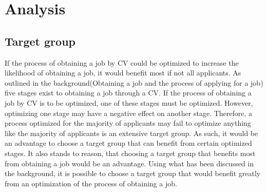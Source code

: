 \section{Analysis}\label{sec:analysis}

\subsection{Target group}
If the process of obtaining a job by CV could be optimized to increase the likelihood of obtaining a job, it would benefit most if not all applicants.
As outlined in the background(Obtaining a job and the process of applying for a job) five stages exist to obtaining a job through a CV.
If the process of obtaining a job by CV is to be optimized, one of these stages must be optimized. 
However, optimizing one stage may have a negative effect on another stage.
Therefore, a process optimized for the majority of applicants may fail to optimize anything like the majority of applicants is an extensive target group.
As such, it would be an advantage to choose a target group that can benefit from certain optimized stages.
It also stands to reason, that choosing a target group that benefits most from obtaining a job would be an advantage.
Using what has been discussed in the background, it is possible to choose a target group that would benefit greatly from an optimization of the process of obtaining a job. \\

